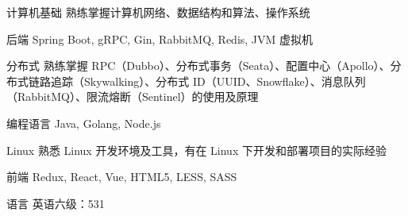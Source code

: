 

\begin{cvskills}

  \cvskill
    {计算机基础} %
    {熟练掌握计算机网络、数据结构和算法、操作系统} %

  \cvskill
    {后端} %
    {Spring Boot, gRPC, Gin, RabbitMQ, Redis, JVM 虚拟机} %

  \cvskill
    {分布式} %
    {熟练掌握 RPC（Dubbo）、分布式事务（Seata）、配置中心（Apollo）、分布式链路追踪（Skywalking）、分布式 ID（UUID、Snowflake）、消息队列（RabbitMQ）、限流熔断（Sentinel）的使用及原理} %

  \cvskill
    {编程语言} %
    {Java, Golang, Node.js} %

  \cvskill
    {Linux} %
    {熟悉 Linux 开发环境及工具，有在 Linux 下开发和部署项目的实际经验} %

  \cvskill
    {前端} %
    {Redux, React, Vue, HTML5, LESS, SASS} %

  \cvskill
    {语言} %
    {英语六级：531} %

\end{cvskills}

